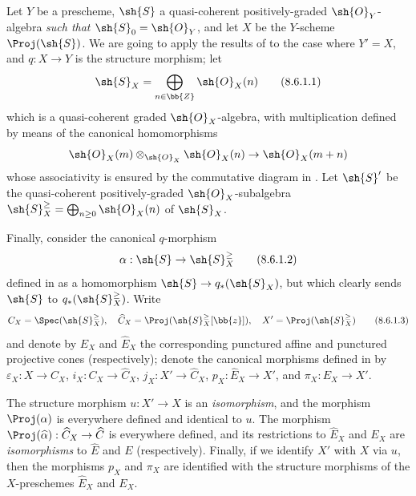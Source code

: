 \begin{env}[8.6.1]
\label{II.8.6.1}
Let $Y$ be a prescheme, $\sh{S}$ a quasi-coherent positively-graded $\sh{O}_Y$-algebra \emph{such that $\sh{S}_0=\sh{O}_Y$}, and let $X$ be the $Y$-scheme $\Proj(\sh{S})$.
We are going to apply the results of  to the case where $Y'=X$, and $q:X\to Y$ is the structure morphism;
let
\[
\label{II.8.6.1.1}
  \sh{S}_X=\bigoplus_{n\in\bb{Z}}\sh{O}_X(n)
  \tag{8.6.1.1}
\]
which is a quasi-coherent graded $\sh{O}_X$-algebra, with multiplication defined by means of the canonical homomorphisms 
\[
  \sh{O}_X(m)\otimes_{\sh{O}_X}\sh{O}_X(n)\to\sh{O}_X(m+n)
\]
whose associativity is ensured by the commutative diagram in .
Let $\sh{S}'$ be the quasi-coherent positively-graded $\sh{O}_X$-subalgebra $\sh{S}_X^\geq=\bigoplus_{n\geq0}\sh{O}_X(n)$ of $\sh{S}_X$.

Finally, consider the canonical $q$-morphism
\[
\label{II.8.6.1.2}
  \alpha: \sh{S} \to \sh{S}_X^\geq
\tag{8.6.1.2}
\]
defined in  as a homomorphism $\sh{S}\to q_*(\sh{S}_X)$, but which clearly sends $\sh{S}$ to $q_*(\sh{S}_X^\geq)$.
Write
\[
\label{II.8.6.1.3}
  C_X = \Spec(\sh{S}_X^\geq),
  \quad
  \widehat{C}_X = \Proj(\sh{S}_X^\geq[\bb{z}]),
  \quad
  X' = \Proj(\sh{S}_X^\geq)
\tag{8.6.1.3}
\]
and denote by $E_X$ and $\widehat{E}_X$ the corresponding punctured affine and punctured projective cones (respectively);
denote the canonical morphisms defined in  by $\varepsilon_X:X\to C_X$, $i_X:C_X\to\widehat{C}_X$, $j_X:X'\to\widehat{C}_X$, $p_X:\widehat{E}_X\to X'$, and $\pi_X:E_X\to X'$.
\end{env}

\begin{proposition}[8.6.2]
\label{II.8.6.2}
The structure morphism $u:X'\to X$ is an \emph{isomorphism}, and the morphism $\Proj(\alpha)$ is everywhere defined and identical to $u$.
The morphism $\Proj(\widehat{\alpha}):\widehat{C}_X\to\widehat{C}$ is everywhere defined, and its restrictions to $\widehat{E}_X$ and $E_X$ are \emph{isomorphisms} to $\widehat{E}$ and $E$ (respectively).
Finally, if we identify $X'$ with $X$ via $u$, then the morphisms $p_X$ and $\pi_X$ are identified with the structure morphisms of the $X$-preschemes $\widehat{E}_X$ and $E_X$.
\end{proposition}

